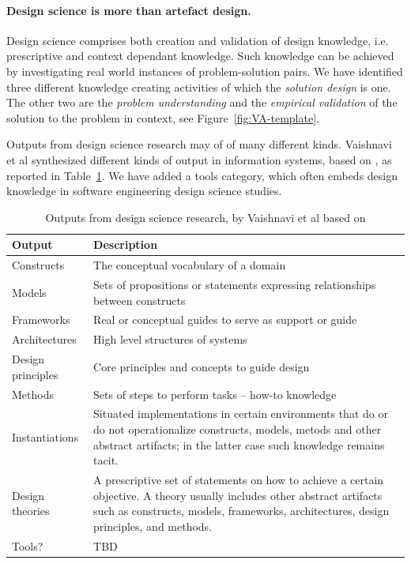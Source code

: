 \documentclass[graybox]{svmult}
\begin{document}
\paragraph{Design science is more than artefact design.}

Design science comprises both creation and validation of design knowledge, i.e. prescriptive and context dependant knowledge. Such knowledge can be achieved by investigating real world instances of problem-solution pairs. We have identified three different knowledge creating activities of which the \emph{solution design} is one. The other two are the \emph{problem understanding} and the \emph{empirical validation} of the solution to the problem in context, see Figure~\ref{fig:VA-template}.

Outputs from design science research may of of many different kinds. Vaishnavi et al \cite{Vaishnavi} synthesized different kinds of output in information systems, based on \cite{March1995} \cite{gregor_positioning_2013}, as reported in Table~\ref{tab:output}. We have added a tools category, which often embeds design knowledge in software engineering design science studies. 
\begin{table}[t]
\caption{Outputs from design science research, by Vaishnavi et al \cite{Vaishnavi} based on \cite{March1995} \cite{gregor_positioning_2013}}
\begin{center}
\begin{tabular}{lp{8cm}}
\textbf{Output}& \textbf{Description}\\
\hline
Constructs & The conceptual vocabulary of a domain\\
Models & Sets of propositions or statements expressing relationships between constructs\\
Frameworks & Real or conceptual guides to serve as support or guide\\
Architectures & High level structures of systems\\
Design principles & Core principles and concepts to guide design\\
Methods & Sets of steps to perform tasks -- how-to knowledge\\
Instantiations & Situated implementations in certain environments that do or do not operationalize constructs, models, metods and other abstract artifacts; in the latter case such knowledge remains tacit.\\
Design theories& A prescriptive set of statements on how to achieve a certain objective. A theory usually includes other abstract artifacts such as constructs, models, frameworks, architectures, design principles, and methods.\\
Tools?&TBD\\
\hline
\end{tabular}
\end{center}
\label{tab:output}
\end{table}%
\end{document}
